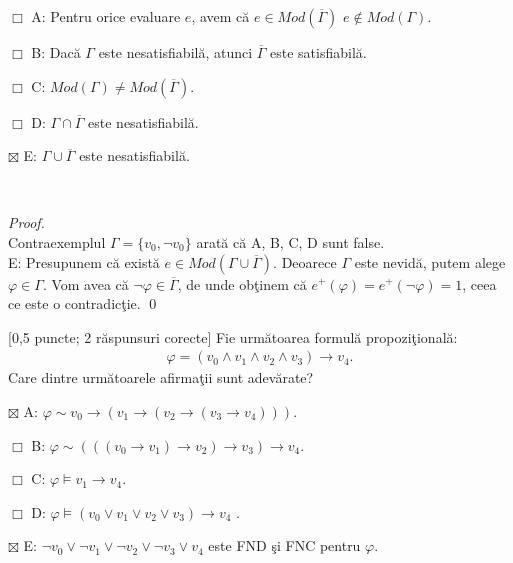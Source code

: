 \documentclass[12pt]{article}
\newcommand{\probex}{\stepcounter{uebno}{\vspace{0.3cm}\noindent \bf (P\arabic{uebno}) }}
\newcommand{\solutiong}[1]{$\,$ \\ \begin{proof}\mbox{}\\#1 \qed \end{proof}}
\begin{document}
$\Box$ A: Pentru orice evaluare $e$, avem c\u{a} $e \in Mod(\overline{\Gamma})$ \ddaca $e \notin Mod(\Gamma)$.

$\Box$ B: Dac\u{a} $\Gamma$ este nesatisfiabil\u{a}, atunci $\overline{\Gamma}$ este satisfiabil\u{a}.

$\Box$ C: $Mod(\Gamma) \neq Mod(\overline{\Gamma})$.

$\Box$ D: $\Gamma \cap \overline{\Gamma}$ este nesatisfiabil\u{a}.

$\boxtimes$ E: $\Gamma \cup \overline{\Gamma}$ este nesatisfiabil\u{a}.

\solutiong{
    Contraexemplul $\Gamma = \{v_0, \neg v_0\}$ arat\u{a} c\u{a} A, B, C, D sunt false. \\ 
    E: Presupunem c\u{a} exist\u{a} $e \in Mod(\Gamma \cup \overline{\Gamma})$. 
    Deoarece $\Gamma$ este nevid\u{a}, putem alege $\varphi \in \Gamma$. 
    Vom avea c\u{a} $\neg \varphi \in \overline{\Gamma}$, 
    de unde ob\c{t}inem c\u{a} $e^+(\varphi) = e^+(\neg \varphi) = 1$, 
    ceea ce este o contradic\c{t}ie.
}

\probex [0,5 puncte; 2 r\u{a}spunsuri corecte]
Fie urm\u{a}toarea formul\u{a} propozi\c{t}ional\u{a}: 
\begin{align*}
\varphi = (v_0 \wedge v_1 \wedge v_2 \wedge v_3) \to v_4. 
\end{align*}
Care dintre urm\u{a}toarele afirma\c{t}ii sunt adev\u{a}rate? 

$\boxtimes$ A: $\varphi \sim v_0 \to (v_1 \to (v_2 \to (v_3 \to v_4)))$.

$\Box$ B: $\varphi \sim (((v_0 \to v_1) \to v_2) \to v_3) \to v_4$.


$\Box$ C: $\varphi \models v_1 \to v_4$.

$\Box$ D: $\varphi \models (v_0 \vee v_1 \vee v_2 \vee v_3) \to v_4$ .


$\boxtimes$ E: $\neg v_0 \vee \neg v_1 \vee \neg v_2 \vee \neg v_3 \vee v_4$ este FND \c{s}i FNC pentru $\varphi$.
\end{document}
